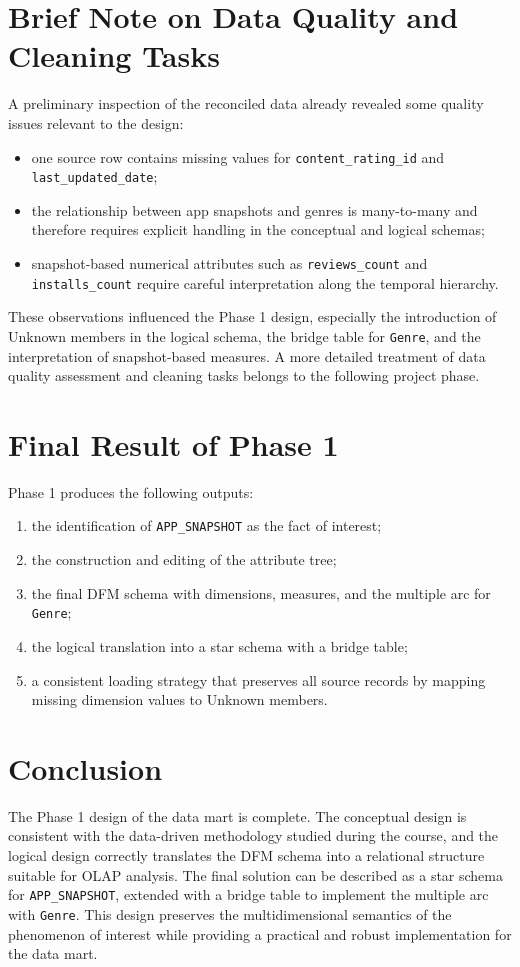 \documentclass[11pt,a4paper]{article}
\begin{document}
\section{Brief Note on Data Quality and Cleaning Tasks}
A preliminary inspection of the reconciled data already revealed some quality issues relevant to the design:
\begin{itemize}[leftmargin=1.5em]
    \item one source row contains missing values for \texttt{content\_rating\_id} and \texttt{last\_updated\_date};
    \item the relationship between app snapshots and genres is many-to-many and therefore requires explicit handling in the conceptual and logical schemas;
    \item snapshot-based numerical attributes such as \texttt{reviews\_count} and \texttt{installs\_count} require careful interpretation along the temporal hierarchy.
\end{itemize}

These observations influenced the Phase 1 design, especially the introduction of Unknown members in the logical schema, the bridge table for \texttt{Genre}, and the interpretation of snapshot-based measures. A more detailed treatment of data quality assessment and cleaning tasks belongs to the following project phase.

\section{Final Result of Phase 1}
Phase 1 produces the following outputs:
\begin{enumerate}[leftmargin=1.5em]
    \item the identification of \texttt{APP\_SNAPSHOT} as the fact of interest;
    \item the construction and editing of the attribute tree;
    \item the final DFM schema with dimensions, measures, and the multiple arc for \texttt{Genre};
    \item the logical translation into a star schema with a bridge table;
    \item a consistent loading strategy that preserves all source records by mapping missing dimension values to Unknown members.
\end{enumerate}

\section{Conclusion}
The Phase 1 design of the data mart is complete. The conceptual design is consistent with the data-driven methodology studied during the course, and the logical design correctly translates the DFM schema into a relational structure suitable for OLAP analysis. The final solution can be described as a star schema for \texttt{APP\_SNAPSHOT}, extended with a bridge table to implement the multiple arc with \texttt{Genre}. This design preserves the multidimensional semantics of the phenomenon of interest while providing a practical and robust implementation for the data mart.
\end{document}
